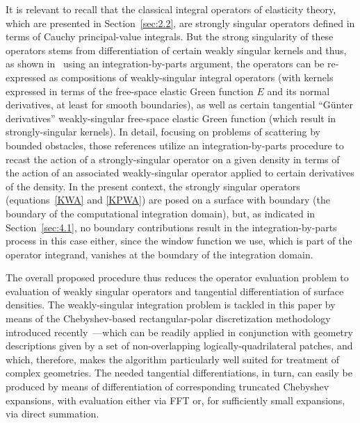 \documentclass[10pt]{article}
\numberwithin{equation}{section}
\begin{document}
It is relevant to recall that the classical integral operators of
elasticity theory, which are presented in Section~\ref{sec:2.2}, are
strongly singular operators defined in terms of Cauchy principal-value
integrals. But the strong singularity of these operators stems from
differentiation of certain weakly singular kernels and thus, as shown
in~\cite{BXY19,YHX17} using an integration-by-parts argument, the
operators can be re-expressed as compositions of weakly-singular
integral operators (with kernels expressed in terms of the free-space
elastic Green function $E$ and its normal derivatives, at least for
smooth boundaries), as well as certain tangential ``G\"unter
derivatives'' weakly-singular free-space elastic Green function (which
result in strongly-singular kernels). In detail, focusing on problems
of scattering by bounded obstacles, those references utilize an
integration-by-parts procedure to recast the action of a
strongly-singular operator on a given density in terms of the action
of an associated weakly-singular operator applied to certain
derivatives of the density. In the present context, the strongly
singular operators (equations~\eqref{KWA} and \eqref{KPWA}) are posed
on a surface with boundary (the boundary of the computational
integration domain), but, as indicated in Section~\ref{sec:4.1}, no
boundary contributions result in the integration-by-parts process in
this case either, since the window function we use, which is part of
the operator integrand, vanishes at the boundary of the integration
domain.


The overall proposed procedure thus reduces the operator evaluation
problem to evaluation of weakly singular operators and tangential
differentiation of surface densities. The weakly-singular integration
problem is tackled in this paper by means of the Chebyshev-based
rectangular-polar discretization methodology introduced
recently~\cite{BG18,BY19}---which can be readily applied in
conjunction with geometry descriptions given by a set of
non-overlapping logically-quadrilateral patches, and which, therefore,
makes the algorithm particularly well suited for treatment of complex
geometries. The needed tangential differentiations, in turn, can
easily be produced by means of differentiation of corresponding
truncated Chebyshev expansions, with evaluation either via FFT or, for
sufficiently small expansions, via direct summation.
\end{document}
